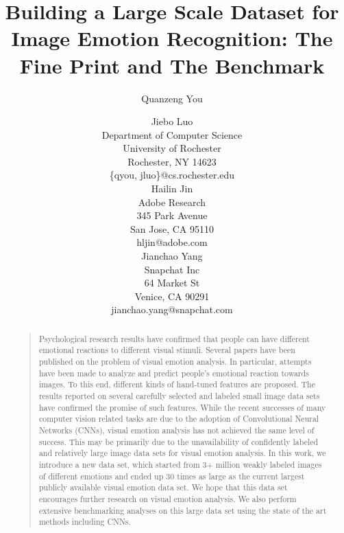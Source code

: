\documentclass[letterpaper]{article}
\begin{document}
%
\title{Building a Large Scale Dataset for Image Emotion Recognition: The Fine Print and The Benchmark}
\author{Quanzeng You \and Jiebo Luo \\
Department of Computer Science \\
University of Rochester \\
Rochester, NY 14623 \\
\{qyou, jluo\}@cs.rochester.edu \\
\And Hailin Jin \\
Adobe Research \\
345 Park Avenue\\
San Jose, CA 95110\\
hljin@adobe.com \\
\And Jianchao Yang \\
Snapchat Inc\\
64 Market St\\
Venice, CA 90291\\
jianchao.yang@snapchat.com\\
}
\maketitle
\begin{abstract}
\begin{quote}
Psychological research results have confirmed that people can have different emotional reactions to different visual stimuli. Several papers have been published on the problem of visual emotion analysis. In particular, attempts have been made to analyze and predict people's emotional reaction towards images. To this end, different kinds of hand-tuned features are proposed. The results reported on several carefully selected and labeled small image data sets have confirmed the promise of such features. While the recent successes of many computer vision related tasks are due to the adoption of Convolutional Neural Networks (CNNs), visual emotion analysis has not achieved the same level of success. This may be primarily due to the unavailability of confidently labeled and relatively large image data sets for visual emotion analysis. In this work, we introduce a new data set, which started from 3+ million weakly labeled images of different emotions and ended up 30 times as large as the current largest publicly available visual emotion data set. We hope that this data set encourages further research on visual emotion analysis. We also perform extensive benchmarking analyses on this large data set using the state of the art methods including CNNs.
\end{quote}
\end{abstract}
\end{document}
